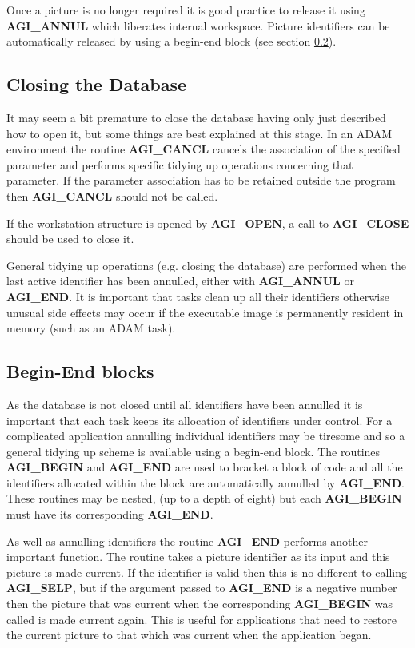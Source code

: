 Once a picture is no longer required it is good practice to release it using
{\bf AGI\_ANNUL} which liberates internal workspace. Picture identifiers
can be automatically released by using a begin-end block (see section
\ref{bend}).

\subsection{Closing the Database}

It may seem a bit premature to close the database having only just
described how to open it, but some things are best explained at this stage.
In an ADAM environment the routine {\bf AGI\_CANCL} cancels the
association of the specified parameter and performs specific tidying
up operations concerning that parameter. If the parameter association
has to be retained outside the program then {\bf AGI\_CANCL} should not
be called.

If the workstation structure is opened by {\bf AGI\_OPEN}, a call to
{\bf AGI\_CLOSE} should be used to close it.

General tidying up operations (e.g. closing the database) are performed
when the last active identifier has been annulled, either with
{\bf AGI\_ANNUL} or {\bf AGI\_END}. It is important that tasks clean
up all their identifiers otherwise unusual side effects may occur if
the executable image is permanently resident in memory (such as an
ADAM task).

\subsection{Begin-End blocks}\label{bend}
As the database is not closed until all identifiers have been annulled
it is important that each task keeps its allocation of identifiers
under control. For a complicated application annulling individual
identifiers may be tiresome and so a general tidying up scheme is
available using a begin-end block. The routines {\bf AGI\_BEGIN} and
{\bf AGI\_END} are used to bracket a block of code and all the
identifiers allocated within the block are automatically annulled
by {\bf AGI\_END}. These routines may be nested, (up to a depth of eight)
but each {\bf AGI\_BEGIN} must have its corresponding {\bf AGI\_END}.

As well as annulling identifiers the routine {\bf AGI\_END} performs another
important function. The routine takes a picture identifier as its input
and this picture is made current. If the identifier is valid then this is
no different to calling {\bf AGI\_SELP}, but if the argument passed to
{\bf AGI\_END} is a negative number then the picture that was current when
the corresponding {\bf AGI\_BEGIN} was called is made current again. This
is useful for applications that need to restore the current picture to
that which was current when the application began.

